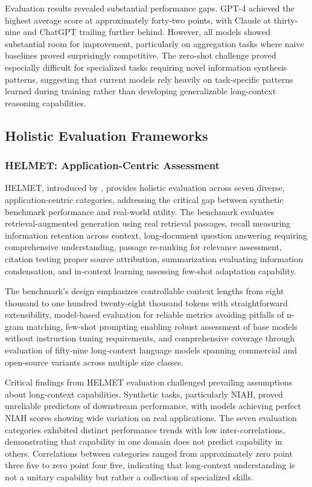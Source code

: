 \documentclass[11pt,letterpaper]{article}
\begin{document}
Evaluation results revealed substantial performance gaps. GPT-4 achieved the highest average score at approximately forty-two points, with Claude at thirty-nine and ChatGPT trailing further behind. However, all models showed substantial room for improvement, particularly on aggregation tasks where naive baselines proved surprisingly competitive. The zero-shot challenge proved especially difficult for specialized tasks requiring novel information synthesis patterns, suggesting that current models rely heavily on task-specific patterns learned during training rather than developing generalizable long-context reasoning capabilities.

\subsection{Holistic Evaluation Frameworks}

\subsubsection{HELMET: Application-Centric Assessment}

HELMET, introduced by \cite{yen2024helmet}, provides holistic evaluation across seven diverse, application-centric categories, addressing the critical gap between synthetic benchmark performance and real-world utility. The benchmark evaluates retrieval-augmented generation using real retrieval passages, recall measuring information retention across context, long-document question answering requiring comprehensive understanding, passage re-ranking for relevance assessment, citation testing proper source attribution, summarization evaluating information condensation, and in-context learning assessing few-shot adaptation capability.

The benchmark's design emphasizes controllable context lengths from eight thousand to one hundred twenty-eight thousand tokens with straightforward extensibility, model-based evaluation for reliable metrics avoiding pitfalls of n-gram matching, few-shot prompting enabling robust assessment of base models without instruction tuning requirements, and comprehensive coverage through evaluation of fifty-nine long-context language models spanning commercial and open-source variants across multiple size classes.

Critical findings from HELMET evaluation challenged prevailing assumptions about long-context capabilities. Synthetic tasks, particularly NIAH, proved unreliable predictors of downstream performance, with models achieving perfect NIAH scores showing wide variation on real applications. The seven evaluation categories exhibited distinct performance trends with low inter-correlations, demonstrating that capability in one domain does not predict capability in others. Correlations between categories ranged from approximately zero point three five to zero point four five, indicating that long-context understanding is not a unitary capability but rather a collection of specialized skills.
\end{document}
